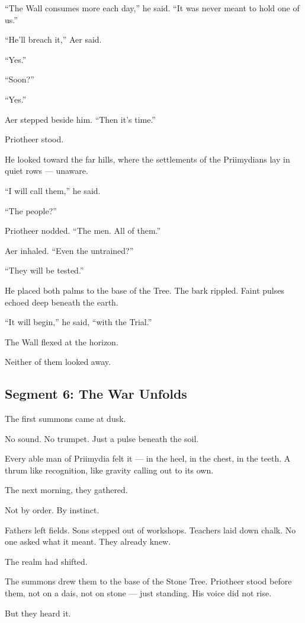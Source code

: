 \documentclass[9pt]{article}
\begin{document}
``The Wall consumes more each day,'' he said. ``It was never meant to hold one of us.''

``He’ll breach it,'' Aer said.

``Yes.''

``Soon?''

``Yes.''

Aer stepped beside him. ``Then it’s time.''

Priotheer stood.

He looked toward the far hills, where the settlements of the Priimydians lay in quiet rows — unaware.

``I will call them,'' he said.

``The people?''

Priotheer nodded. ``The men. All of them.''

Aer inhaled. ``Even the untrained?''

``They will be tested.''

He placed both palms to the base of the Tree. The bark rippled. Faint pulses echoed deep beneath the earth.

``It will begin,'' he said, ``with the Trial.''

The Wall flexed at the horizon.

Neither of them looked away.


\newpage

\subsection*{Segment 6: The War Unfolds}

The first summons came at dusk.

No sound. No trumpet. Just a pulse beneath the soil.

Every able man of Priimydia felt it — in the heel, in the chest, in the teeth. A thrum like recognition, like gravity calling out to its own.

The next morning, they gathered.

Not by order. By instinct.

Fathers left fields. Sons stepped out of workshops. Teachers laid down chalk. No one asked what it meant. They already knew.

The realm had shifted.

The summons drew them to the base of the Stone Tree. Priotheer stood before them, not on a dais, not on stone — just standing. His voice did not rise.

But they heard it.
\end{document}
